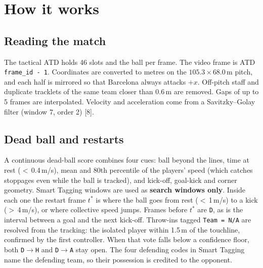 \documentclass[10pt,a4paper]{article}
\newcommand{\code}[1]{\texttt{\small #1}}
\begin{document}
\section{How it works}
\subsection{Reading the match}
The tactical ATD holds 46 slots and the ball per frame. The video frame is ATD \code{frame\_id - 1}. Coordinates are converted to metres on the $105.3\times68.0$\,m pitch, and each half is mirrored so that Barcelona always attacks $+x$. Off-pitch staff and duplicate tracklets of the same team closer than 0.6\,m are removed. Gaps of up to 5 frames are interpolated. Velocity and acceleration come from a Savitzky--Golay filter (window 7, order 2) [8].

\subsection{Dead ball and restarts}
A continuous dead-ball score combines four cues: ball beyond the lines, time at rest ($<$\,0.4\,m/s), mean and 80th percentile of the players' speed (which catches stoppages even while the ball is tracked), and kick-off, goal-kick and corner geometry. Smart Tagging windows are used as \textbf{search windows only}. Inside each one the restart frame $t^*$ is where the ball goes from rest ($<$\,1\,m/s) to a kick ($>$\,4\,m/s), or where collective speed jumps. Frames before $t^*$ are \code{D}, as is the interval between a goal and the next kick-off. Throw-ins tagged \code{Team = N/A} are resolved from the tracking: the isolated player within 1.5\,m of the touchline, confirmed by the first controller. When that vote falls below a confidence floor, both \code{D}$\to$\code{H} and \code{D}$\to$\code{A} stay open. The four defending codes in Smart Tagging name the defending team, so their possession is credited to the opponent.
\end{document}
